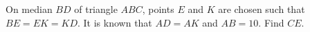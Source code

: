 On median $BD$ of triangle $ABC$, points $E$ and $K$ are chosen such that $BE=EK=KD$. It is known that $AD=AK$ and $AB=10$. Find $CE$.

